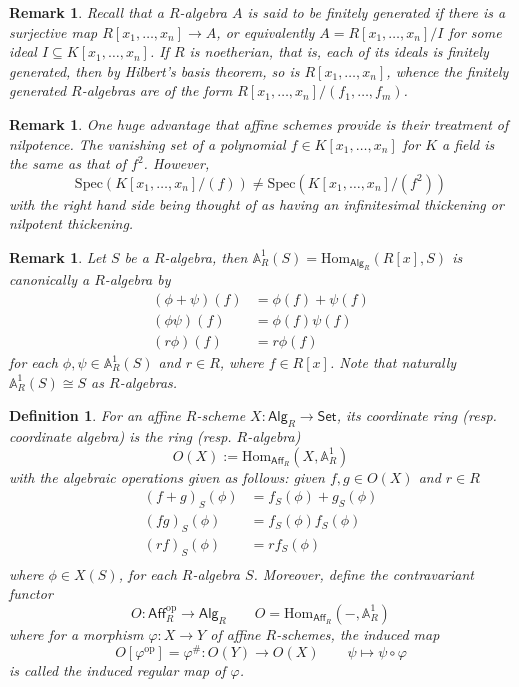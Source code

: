 \documentclass[10pt]{book}
\theoremstyle{bookplain}
\theoremstyle{bookdefinition}
\newtheorem{definition}[theorem]{Definition}
\theoremstyle{bookremark}
\newtheorem{remark}[theorem]{Remark}
\begin{document}
\begin{remark}
Recall that a $R$-algebra $A$ is said to be finitely generated if there is a surjective map $R[x_1,\dots,x_n]\rightarrow A$, or equivalently $A=R[x_1,\dots,x_n]/I$ for some ideal $I\subseteq K[x_1,\dots,x_n]$. 
If $R$ is noetherian, that is, each of its ideals is finitely generated, then by Hilbert's basis theorem, so is $R[x_1,\dots,x_n]$, whence the finitely generated $R$-algebras are  of the form $R[x_1,\dots,x_n]/(f_1,\dots,f_m)$. 

\end{remark}

\begin{remark}
One huge advantage that affine schemes provide is their treatment of \textit{nilpotence}. The vanishing set of a polynomial $f\in K[x_1,\dots,x_n]$ for $K$ a field is the same as that of $f^2$. However, 
\[\mathrm{Spec}(K[x_1,\dots,x_n]/(f))\ne \mathrm{Spec}(K[x_1,\dots,x_n]/(f^2))\]
with the right hand side being thought of as having an \textit{infinitesimal thickening} or \textit{nilpotent thickening}. 

\end{remark}

\begin{remark}Let $S$ be a $R$-algebra, then $\mathbb{A}^1_R(S)=\mathrm{Hom}_{\mathsf{Alg}_R}(R[x],S)$ is canonically a $R$-algebra by
    \[\begin{aligned}
        (\phi+\psi)(f)&=\phi(f)+\psi(f)\\
        (\phi \psi)(f)&=\phi(f)\psi(f)\\
        (r\phi)(f)&=r\phi(f)
    \end{aligned}
    \]
    for each $\phi,\psi\in \mathbb A_R^1(S)$ and $r\in R$, where $f\in R[x]$. Note that naturally $\mathbb A_R^1(S)\cong S$ as $R$-algebras. 
\end{remark}
\begin{definition}
    For an affine $R$-scheme $X:\mathsf{Alg}_R\rightarrow\mathsf{Set}$, its \textit{coordinate ring} (resp. \textit{coordinate algebra}) is the ring (resp. $R$-algebra)
    \[O(X):=\mathrm{Hom}_{\mathsf{Aff}_R}(X,\mathbb A_R^1)\]
    with the algebraic operations given as follows: given $f,g\in O(X)$ and $r\in R$
    \[\begin{aligned}
        (f+g)_S(\phi)&=f_S(\phi)+g_S(\phi)\\
        (fg)_S(\phi)&=f_S(\phi)f_S(\phi)\\
        (rf)_S(\phi)&=rf_S(\phi)\\
    \end{aligned}
    \]
    where $\phi\in X(S)$, for each $R$-algebra $S$. Moreover, define the contravariant functor 
    \[O:\mathsf{Aff}_R^{\mathrm{op}}\rightarrow \mathsf{Alg}_R\qquad O=\mathrm{Hom}_{\mathsf{Aff}_R}(-,\mathbb A_R^1)\]
    where for a morphism $\varphi:X\rightarrow Y$ of affine $R$-schemes, the induced map
    \[O[\varphi^{\mathrm{op}}]=\varphi^{\#}:O(Y)\rightarrow O(X)\qquad \psi\mapsto \psi\circ \varphi \]
    is called the \textit{induced regular map} of $\varphi$. 
\end{definition}
\end{document}
